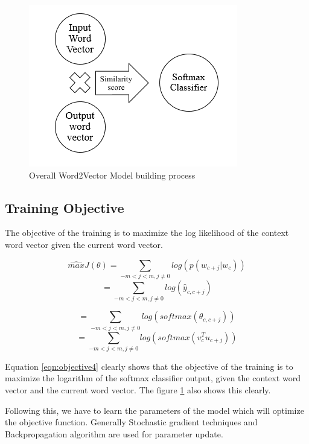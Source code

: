 \begin{figure}
  \centering
  \includegraphics{1_3_Overall_process}
  \caption{Overall Word2Vector Model building process}
  \label{fig:1_3_Overall_process}
\end{figure}


\subsection{Training Objective}
The objective of the training is to maximize the log likelihood of the context word vector given the current word vector. 

\begin{equation}
    \hat{max} J(\theta)=\sum_{-m<j<m,j\neq0}{log(p(w_{c+j}|w_c))}
\end{equation}
\begin{equation}
    =\sum_{-m<j<m,j\neq0}{log(\hat{y}_{c,c+j})}
\end{equation}

\begin{equation}
    =\sum_{-m<j<m,j\neq0}{log(softmax(\theta_{c,c+j}))}
\end{equation}
\begin{equation}
    =\sum_{-m<j<m,j\neq0}{log(softmax(v_{c}^T u_{c+j}))}
    \label{eqn:objective4}
\end{equation}


Equation \ref{eqn:objective4} clearly shows that the objective of the training is to maximize the logarithm of the softmax classifier output, given the context word vector and the current word vector. The figure \ref{fig:1_3_Overall_process} also shows this clearly.

Following this, we have to learn the parameters of the model which will optimize the objective function. Generally Stochastic gradient techniques and Backpropagation algorithm are used for parameter update.

